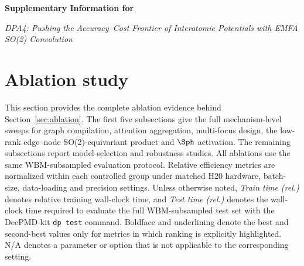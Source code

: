
\renewcommand{\thefigure}{S-\arabic{figure}}
\setcounter{figure}{0}
\renewcommand{\thetable}{S-\arabic{table}}
\setcounter{table}{0}
\renewcommand{\thesection}{S-\arabic{section}}
\setcounter{section}{0}
\makeatletter
{}
{\newcommand{\theHfigure}{S-\arabic{figure}}}
{\renewcommand{\theHfigure}{S-\arabic{figure}}}
{\newcommand{\theHtable}{S-\arabic{table}}}
{\renewcommand{\theHtable}{S-\arabic{table}}}
{\newcommand{\theHsection}{S-\arabic{section}}}
{\renewcommand{\theHsection}{S-\arabic{section}}}
\makeatother

\FloatBarrier
\begin{center}
    {\LARGE\bfseries Supplementary Information for

        \textit{DPA4: Pushing the Accuracy--Cost Frontier of Interatomic
            Potentials with EMFA SO(2) Convolution} \par}
    \vspace{1em}
\end{center}



\FloatBarrier
\section{Ablation study}
\label{sec:sm-ablation}

This section provides the complete ablation evidence behind
Section~\ref{sec:ablation}. The first five subsections give the full
mechanism-level sweeps for graph compilation, attention aggregation,
multi-focus design, the low-rank edge--node SO(2)-equivariant
product and $\Sph$ activation. The
remaining subsections report model-selection and robustness studies. All ablations use the same
WBM-subsampled evaluation protocol. Relative efficiency metrics are normalized
within each controlled group under matched H20 hardware, batch-size,
data-loading and precision settings. Unless otherwise noted,
\textit{Train time (rel.)} denotes relative training wall-clock time, and
\textit{Test time (rel.)} denotes the wall-clock time required to evaluate the
full WBM-subsampled test set with the DeePMD-kit \texttt{dp test} command.
Boldface and underlining denote the best and second-best values only for metrics
in which ranking is explicitly highlighted. N/A denotes a parameter or option
that is not applicable to the corresponding setting.

